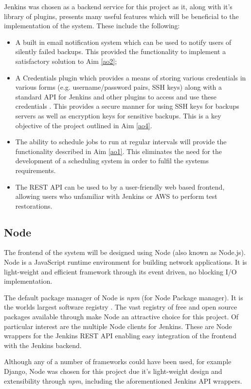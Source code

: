 Jenkins was chosen as a backend service for this project as it, along with it's library of plugins, presents many useful features which will be beneficial to the implementation of the system. These include the following:
\begin{itemize}
	\item A built in email notification system which can be used to notify users of silently failed backups. This provided the functionality to implement a satisfactory solution to Aim \ref{ao2};
	\item A Credentials plugin which provides a means of storing various credentials in various forms (e.g. username/password pairs, SSH keys) along with a standard API for Jenkins and other plugins to access and use these credentials \citep{connolly}. This provides a secure manner for using SSH keys for backups servers as well as encryption keys for sensitive backups. This is a key objective of the project outlined in Aim \ref{ao4}.
	\item The ability to schedule jobs to run at regular intervals will provide the functionality described in Aim \ref{ao1}. This eliminates the need for the development of a scheduling system in order to fulfil the systems requirements. 
	\item The REST API can be used to by a user-friendly web based frontend, allowing users who unfamiliar with Jenkins or AWS to perform test restorations. 
\end{itemize}


\subsection{Node}
The frontend of the system will be designed using Node (also known as Node.js). Node is a JavaScript runtime environment for building network applications. It is light-weight and efficient framework through its event driven, no blocking I/O implementation. 

The default package manager of Node is \textit{npm} (for Node Package manager). It is the worlds largest software registry \citep{npm}. The vast registry of free and open source packages available through make Node an attractive choice for this project. Of particular interest are the multiple Node clients for Jenkins. These are Node wrappers for the Jenkins REST API enabling easy integration of the frontend with the Jenkins backend.

Although any of a number of frameworks could have been used, for example Django, Node was chosen for this project due it's light-weight design and extensibility through \textit{npm}, including the aforementioned Jenkins API wrappers.
 
